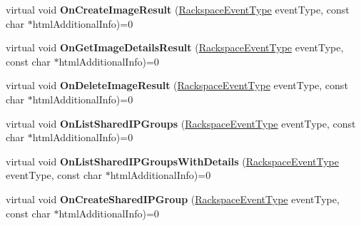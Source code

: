 \begin{DoxyCompactItemize}
\item 
\hypertarget{class_rak_net_1_1_rackspace2_event_callback_a5e0cd56256bc8a6f7bd3f735f39afa7e}{virtual void {\bfseries On\-Create\-Image\-Result} (\hyperlink{namespace_rak_net_a120cf6e1a0904cff45269f14c3c4c289}{Rackspace\-Event\-Type} event\-Type, const char $\ast$html\-Additional\-Info)=0}\label{class_rak_net_1_1_rackspace2_event_callback_a5e0cd56256bc8a6f7bd3f735f39afa7e}

\item 
\hypertarget{class_rak_net_1_1_rackspace2_event_callback_ac73a0b3ced2a53c4b7a4b6af0c1a92aa}{virtual void {\bfseries On\-Get\-Image\-Details\-Result} (\hyperlink{namespace_rak_net_a120cf6e1a0904cff45269f14c3c4c289}{Rackspace\-Event\-Type} event\-Type, const char $\ast$html\-Additional\-Info)=0}\label{class_rak_net_1_1_rackspace2_event_callback_ac73a0b3ced2a53c4b7a4b6af0c1a92aa}

\item 
\hypertarget{class_rak_net_1_1_rackspace2_event_callback_a9b54c2bc5d956fd631cdb266c4d2b742}{virtual void {\bfseries On\-Delete\-Image\-Result} (\hyperlink{namespace_rak_net_a120cf6e1a0904cff45269f14c3c4c289}{Rackspace\-Event\-Type} event\-Type, const char $\ast$html\-Additional\-Info)=0}\label{class_rak_net_1_1_rackspace2_event_callback_a9b54c2bc5d956fd631cdb266c4d2b742}

\item 
\hypertarget{class_rak_net_1_1_rackspace2_event_callback_a117634c0ec4a6627d8afe3b99f581f39}{virtual void {\bfseries On\-List\-Shared\-I\-P\-Groups} (\hyperlink{namespace_rak_net_a120cf6e1a0904cff45269f14c3c4c289}{Rackspace\-Event\-Type} event\-Type, const char $\ast$html\-Additional\-Info)=0}\label{class_rak_net_1_1_rackspace2_event_callback_a117634c0ec4a6627d8afe3b99f581f39}

\item 
\hypertarget{class_rak_net_1_1_rackspace2_event_callback_a7d2be82c53b1ec5dd98c408a663fd179}{virtual void {\bfseries On\-List\-Shared\-I\-P\-Groups\-With\-Details} (\hyperlink{namespace_rak_net_a120cf6e1a0904cff45269f14c3c4c289}{Rackspace\-Event\-Type} event\-Type, const char $\ast$html\-Additional\-Info)=0}\label{class_rak_net_1_1_rackspace2_event_callback_a7d2be82c53b1ec5dd98c408a663fd179}

\item 
\hypertarget{class_rak_net_1_1_rackspace2_event_callback_a893fa9f7d0cbaec5e022dccb7af017b7}{virtual void {\bfseries On\-Create\-Shared\-I\-P\-Group} (\hyperlink{namespace_rak_net_a120cf6e1a0904cff45269f14c3c4c289}{Rackspace\-Event\-Type} event\-Type, const char $\ast$html\-Additional\-Info)=0}\label{class_rak_net_1_1_rackspace2_event_callback_a893fa9f7d0cbaec5e022dccb7af017b7}


\end{DoxyCompactItemize}
